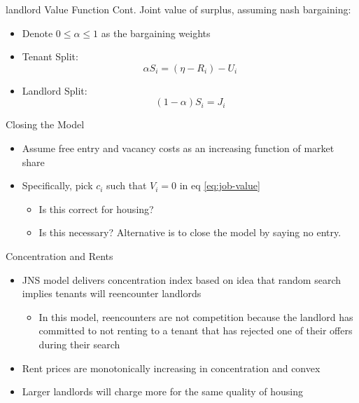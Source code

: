 \documentclass[10pt, xcolor=dvipsnames]{beamer}
\begin{document}
\begin{frame}{landlord Value Function Cont.}
Joint value of surplus, assuming nash bargaining:
    \begin{itemize}
        \item Denote $0\leq \alpha \leq 1$ as the bargaining weights
        \item Tenant Split: \begin{equation}\label{eq:nash-tenant}
            \alpha S_i = (\eta - R_i) - U_i
        \end{equation}
        \item Landlord Split: \begin{equation}\label{eq:nash-landlord}
            (1-\alpha)S_i = J_i
        \end{equation}
    \end{itemize}
\end{frame}

\begin{frame}{Closing the Model}
    \begin{itemize}
    \item Assume free entry and vacancy costs as an increasing function of market share
    \item Specifically, pick $c_i$ such that $V_i=0$ in eq \ref{eq:job-value}
    \begin{itemize}
        \item Is this correct for housing?
        \item Is this necessary? Alternative is to close the model by saying no entry.
    \end{itemize}
\end{itemize}
\end{frame}

\begin{frame}{Concentration and Rents}
    \begin{itemize}
        \item JNS model delivers concentration index based on idea that random search implies tenants will reencounter landlords
        \begin{itemize}
            \item In this model, reencounters are not competition because the landlord has committed to not renting to a tenant that has rejected one of their offers during their search 
        \end{itemize}
        \item Rent prices are monotonically increasing in concentration and convex
        \item Larger landlords will charge more for the same quality of housing
    \end{itemize}
\end{frame}
\end{document}
